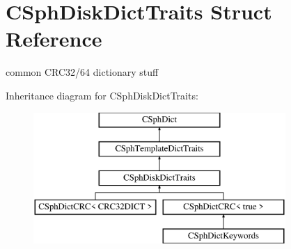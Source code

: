 \hypertarget{structCSphDiskDictTraits}{\section{C\-Sph\-Disk\-Dict\-Traits Struct Reference}
\label{structCSphDiskDictTraits}
}


common C\-R\-C32/64 dictionary stuff  


Inheritance diagram for C\-Sph\-Disk\-Dict\-Traits\-:\begin{figure}[H]
\begin{center}
\leavevmode
\includegraphics[height=5.000000cm]{structCSphDiskDictTraits}
\end{center}
\end{figure}
